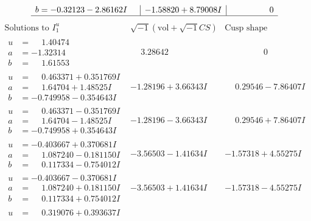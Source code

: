 \documentclass[1p]{elsarticle_modified}
\theoremstyle{definition}
\newcommand{\I}{\sqrt{-1}}
\begin{document}
$$\begin{array}{c|c|c}
\begin{aligned}
b &= -0.32123 - 2.86162 I\end{aligned}
 & -1.58820 + 8.79008 I & \phantom{-0.000000 } 0\\
 \hline 
 \end{array}$$\newpage$$\begin{array}{c|c|c}  
\text{Solutions to }I^u_{1}& \I (\text{vol} + \sqrt{-1}CS) & \text{Cusp shape}\\
 \hline 
\begin{aligned}
u &= \phantom{-}1.40474\phantom{ +0.000000I} \\
a &= -1.32314\phantom{ +0.000000I} \\
b &= \phantom{-}1.61553\phantom{ +0.000000I}\end{aligned}
 & \phantom{-}3.28642\phantom{ +0.000000I} & \phantom{-0.000000 } 0 \\ \hline\begin{aligned}
u &= \phantom{-}0.463371 + 0.351769 I \\
a &= \phantom{-}1.64704 + 1.48525 I \\
b &= -0.749958 - 0.354643 I\end{aligned}
 & -1.28196 + 3.66343 I & \phantom{-}0.29546 - 7.86407 I \\ \hline\begin{aligned}
u &= \phantom{-}0.463371 - 0.351769 I \\
a &= \phantom{-}1.64704 - 1.48525 I \\
b &= -0.749958 + 0.354643 I\end{aligned}
 & -1.28196 - 3.66343 I & \phantom{-}0.29546 + 7.86407 I \\ \hline\begin{aligned}
u &= -0.403667 + 0.370681 I \\
a &= \phantom{-}1.087240 - 0.181150 I \\
b &= \phantom{-}0.117334 - 0.754012 I\end{aligned}
 & -3.56503 - 1.41634 I & -1.57318 + 4.55275 I \\ \hline\begin{aligned}
u &= -0.403667 - 0.370681 I \\
a &= \phantom{-}1.087240 + 0.181150 I \\
b &= \phantom{-}0.117334 + 0.754012 I\end{aligned}
 & -3.56503 + 1.41634 I & -1.57318 - 4.55275 I \\ \hline\begin{aligned}
u &= \phantom{-}0.319076 + 0.393637 I \\

\end{aligned}
\end{array}$$
\end{document}
